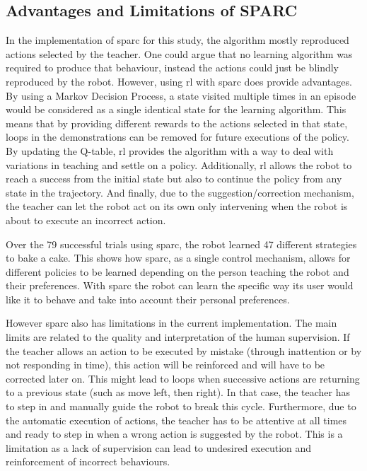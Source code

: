 \subsection{Advantages and Limitations of SPARC}

In the implementation of \gls{sparc} for this study, the algorithm mostly reproduced actions selected by the teacher. One could argue that no learning algorithm was required to produce that behaviour, instead the actions could just be blindly reproduced by the robot. However, using \gls{rl} with \gls{sparc} does provide advantages. By using a Markov Decision Process, a state visited multiple times in an episode would be considered as a single identical state for the learning algorithm. This means that by providing different rewards to the actions selected in that state, loops in the demonstrations can be removed for future executions of the policy. By updating the Q-table, \gls{rl} provides the algorithm with a way to deal with variations in teaching and settle on a policy. Additionally, \gls{rl} allows the robot to reach a success from the initial state but also to continue the policy from any state in the trajectory. And finally, due to the suggestion/correction mechanism, the teacher can let the robot act on its own only intervening when the robot is about to execute an incorrect action. 

Over the 79 successful trials using \gls{sparc}, the robot learned 47 different strategies to bake a cake. This shows how \gls{sparc}, as a single control mechanism, allows for different policies to be learned depending on the person teaching the robot and their preferences. With \gls{sparc} the robot can learn the specific way its user would like it to behave and take into account their personal preferences.

However \gls{sparc} also has limitations in the current implementation. The main limits are related to the quality and interpretation of the human supervision. If the teacher allows an action to be executed by mistake (through inattention or by not responding in time), this action will be reinforced and will have to be corrected later on. This might lead to loops when successive actions are returning to a previous state (such as move left, then right). In that case, the teacher has to step in and manually guide the robot to break this cycle. Furthermore, due to the automatic execution of actions, the teacher has to be attentive at all times and ready to step in when a wrong action is suggested by the robot. This is a limitation as a lack of supervision can lead to undesired execution and reinforcement of incorrect behaviours.

